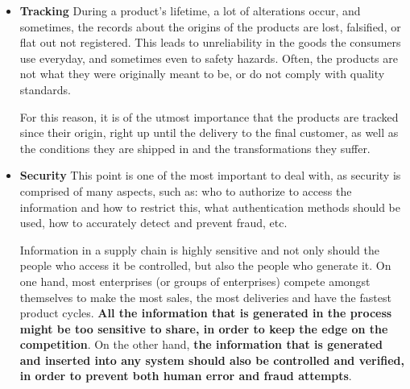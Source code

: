 \begin{itemize}
\item \textbf{Tracking}
During a product's lifetime, a lot of alterations occur, and sometimes, the records about the origins of the products are lost, falsified, or flat out not registered. This leads to unreliability in the goods the consumers use everyday, and sometimes even to safety hazards. Often, the products are not what they were originally meant to be, or do not comply with quality standards.



For this reason, it is of the utmost importance that the products are tracked since their origin, right up until the delivery to the final customer, as well as the conditions they are shipped in and the transformations they suffer.

\item \textbf{Security}
This point is one of the most important to deal with, as security is comprised of many aspects, such as: who to authorize to access the information and how to restrict this, what authentication methods should be used, how to accurately detect and prevent fraud, etc. 

Information in a supply chain is highly sensitive and not only should the people who access it be controlled, but also the people who generate it.  On one hand, most enterprises (or groups of enterprises) compete amongst themselves to make the most sales, the most deliveries and have the fastest product cycles. \textbf{All the information that is generated in the process might be too sensitive to share, in order to keep the edge on the competition}.
On the other hand, \textbf{the information that is generated and inserted into any system should also be controlled and verified, in order to prevent both human error and fraud attempts}.


\end{itemize}

